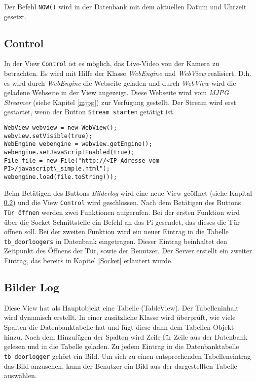 Der Befehl \texttt{NOW()} wird in der Datenbank mit dem aktuellen Datum und Uhrzeit gesetzt.\\

\subsection{Control}
In der View \texttt{Control} ist es möglich, das Live-Video von der Kamera zu betrachten. Es wird mit Hilfe der Klasse \textit{WebEngine} und \textit{WebView} realisiert. D.h. es wird durch \textit{WebEngine} die Webseite geladen und durch \textit{WebView} wird die geladene Webseite in der View angezeigt. Diese Webseite wird vom \textit{MJPG Streamer} (siehe Kapitel \ref{mjpg}) zur Verfügung gestellt. Der Stream wird erst gestartet, wenn der Button \texttt{Stream starten} getätigt ist.

\newpage

\begin{lstlisting}[caption={Stream Einbindung},captionpos=b]
WebView webview = new WebView();
webview.setVisible(true);
WebEngine webengine = webview.getEngine();
webengine.setJavaScriptEnabled(true);
File file = new File("http://<IP-Adresse vom PI>/javascript\_simple.html");
webengine.load(file.toString());
\end{lstlisting}

Beim Betätigen des Buttons \textit{Bilderlog} wird eine neue View geöffnet (siehe Kapital \ref{bilderLog}) und die View \texttt{Control} wird geschlossen. Nach dem Betätigen des Buttons \texttt{Tür öffnen} werden zwei Funktionen aufgerufen. Bei der ersten Funktion wird über die Socket-Schnittstelle ein Befehl an das Pi gesendet, das dieses die Tür öffnen soll. Bei der zweiten Funktion wird ein neuer Eintrag in die Tabelle \texttt{tb\_doorloogers} in Datenbank eingetragen. Dieser Eintrag beinhaltet den Zeitpunkt des Öffnens der Tür, sowie der Benutzer. Der Server erstellt ein zweiter Eintrag, das bereits in Kapitel \ref{Socket} erläutert wurde.\\


\subsection{Bilder Log}\label{bilderLog}
Diese View hat als Hauptobjekt eine Tabelle (TableView). Der Tabelleninhalt wird dynamisch erstellt. In einer zusätzliche Klasse wird überprüft, wie viele Spalten die Datenbanktabelle hat und fügt diese dann dem Tabellen-Objekt hinzu. Nach dem Hinzufügen der Spalten wird Zeile für Zeile aus der Datenbank gelesen und in die Tabelle geladen. Zu jedem Eintrag in die Datenbanktabelle \texttt{tb\_doorlogger} gehört ein Bild. Um sich zu einen entsprechenden Tabelleneintrag das Bild anzusehen, kann der Benutzer ein Bild aus der dargestellten Tabelle auswählen.\\







